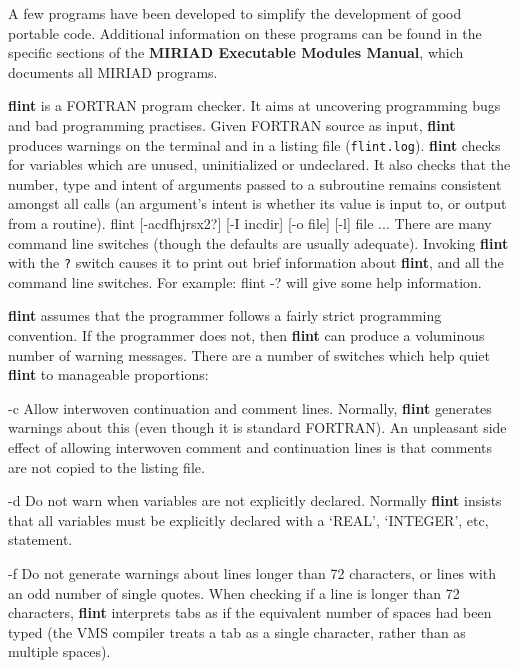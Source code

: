
A few programs have been developed to simplify the development of good
portable code.  Additional information on these programs can be found in
the specific sections of the {\bf MIRIAD Executable Modules Manual},
which documents all MIRIAD programs.


{\bf flint} is a FORTRAN program checker. It aims at uncovering programming
bugs and bad programming practises. Given FORTRAN source as input, {\bf flint}
produces warnings on the terminal and in a listing file ({\tt flint.log}).
{\bf flint} checks for variables which are unused, uninitialized or
undeclared. It also checks that the number, type and intent of arguments
passed to a subroutine remains consistent amongst all calls (an argument's
intent is whether its value is input to, or output from a routine).
{\ninepoint\begintt
     flint [-acdfhjrsx2?] [-I incdir] [-o file] [-l] file ...
\endtt}
There are many command line switches (though the defaults are usually
adequate).  Invoking {\bf flint} with the {\tt ?} switch causes it to
print out brief information about {\bf flint}, and all the command line
switches. For example:
{\ninepoint\begintt
     flint -?
\endtt}
will give some help information.


{\bf flint} assumes that the programmer follows a fairly strict programming
convention. If the programmer does not, then {\bf flint} can produce a
voluminous number of warning messages. There are a number of switches which
help quiet {\bf flint} to manageable proportions:

\item{-c} Allow interwoven continuation and comment lines. Normally,
{\bf flint} generates warnings about this (even though it is standard
FORTRAN).  An unpleasant side effect of allowing interwoven comment and
continuation lines is that comments are not copied to the listing file.

\item{-d} Do not warn when variables are not explicitly declared. Normally
{\bf flint} insists that all variables must be explicitly declared with a
`REAL', `INTEGER', etc, statement.

\item{-f} Do not generate warnings about lines longer than 72 characters,
or lines with an odd number of single quotes. When checking if a line is
longer than 72 characters, {\bf flint} interprets tabs as if the equivalent
number of spaces had been typed (the VMS compiler treats a tab as a single
character, rather than as multiple spaces).

